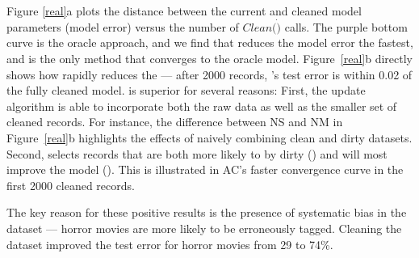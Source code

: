 % 

Figure \ref{real}a plots the distance between the current and cleaned model parameters (model error) versus the number of $Clean(\dot)$ calls.  
The purple bottom curve is the oracle approach, and we find that \sys reduces the model error the fastest, and is the only method that converges to the oracle model.
Figure~\ref{real}b directly shows how \sys rapidly reduces the  --- after 2000 records, \sys's test error is within 0.02 of the fully cleaned model.
\sys is superior for several reasons: First, the update algorithm is able to incorporate both the raw data as well as the smaller set of cleaned records.
For instance, the difference between NS and NM in Figure~\ref{real}b highlights the effects of naively combining clean and dirty datasets.
Second, \sys selects records that are both more likely to by dirty () and will most improve the model ().
This is illustrated in AC's faster convergence curve in the first 2000 cleaned records.

The key reason for these positive results is the presence of systematic bias in the dataset --- horror movies are more likely to be erroneously tagged.
Cleaning the dataset improved the test error for horror movies from 29 to 74\%.

